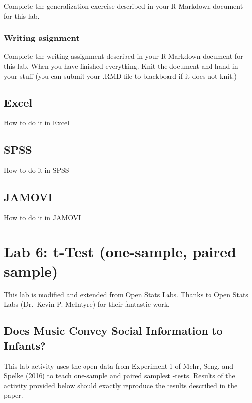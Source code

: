 \documentclass[]{book}
\theoremstyle{definition}
\theoremstyle{definition}
\theoremstyle{definition}
\theoremstyle{remark}
\begin{document}
Complete the generalization exercise described in your R Markdown
document for this lab.

\subsection{Writing asignment}\label{writing-asignment-3}

Complete the writing assignment described in your R Markdown document
for this lab. When you have finished everything. Knit the document and
hand in your stuff (you can submit your .RMD file to blackboard if it
does not knit.)

\section{Excel}\label{excel-4}

How to do it in Excel

\section{SPSS}\label{spss-4}

How to do it in SPSS

\section{JAMOVI}\label{jamovi-4}

How to do it in JAMOVI

\chapter{Lab 6: t-Test (one-sample, paired
sample)}\label{lab-6-t-test-one-sample-paired-sample}

This lab is modified and extended from
\href{https://sites.trinity.edu/osl}{Open Stats Labs}. Thanks to Open
Stats Labs (Dr.~Kevin P. McIntyre) for their fantastic work.

\section{Does Music Convey Social Information to
Infants?}\label{does-music-convey-social-information-to-infants}

This lab activity uses the open data from Experiment 1 of Mehr, Song,
and Spelke (2016) to teach one-sample and paired samplest -tests.
Results of the activity provided below should exactly reproduce the
results described in the paper.
\end{document}
